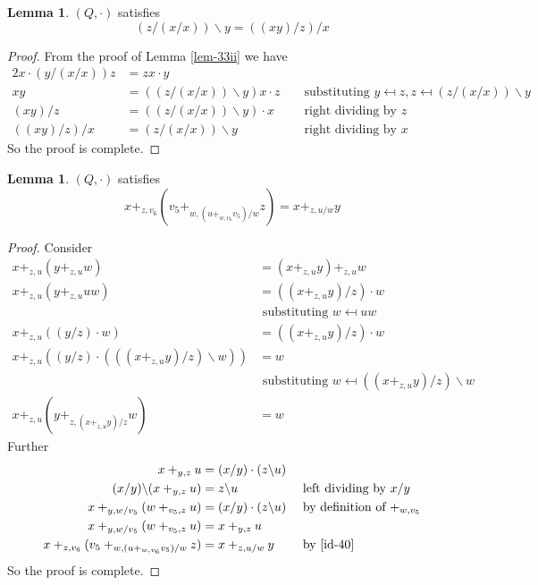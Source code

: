 \documentclass[12pt]{report}
\theoremstyle{definition}
\newtheorem{lem}[thm]{Lemma}
\newcommand{\ldv}{\backslash}       %
\newcommand{\rdv}{/}                %
\begin{document}
\begin{lem}\label{lem-38}
  $(Q,\cdot)$ satisfies
  \[(z\rdv(x\rdv x))\ldv y = ((xy)\rdv z)\rdv x\]
\end{lem}

\begin{proof}
  From the proof of Lemma \ref{lem-33ii} we have
  \begin{alignat*}{2}
    x\cdot (y\rdv(x\rdv x))z &= zx\cdot y &&\\
    xy &= ((z\rdv(x\rdv x))\ldv y)x \cdot z &&\text{ substituting
      $y\mapsfrom z, z\mapsfrom (z\rdv(x\rdv x))\ldv y$}\\
    (xy)\rdv z &= ((z\rdv(x\rdv x))\ldv y)\cdot x &&\text{ right dividing by $z$}\\
    ((xy)\rdv z)\rdv x &= (z\rdv(x\rdv x))\ldv y &&\text{ right dividing by $x$}
  \end{alignat*}
  So the proof is complete.
\end{proof}

\begin{lem}\label{lem-42}
  $(Q, \cdot)$ satisfies
  \[x +_{z, v_6} (v_5 +_{w, (u +_{w, v_6} v_5)\rdv w} z) = x +_{z, u\rdv w} y\] 
\end{lem}

\begin{proof}
  Consider
  \begin{align*}
    x +_{z, u} (y +_{z, u} w) &= (x +_{z, u} y) +_{z, u} w\\
    x +_{z, u} (y +_{z, u} uw) &= ((x +_{z, u} y)\rdv z)\cdot w\\
      &\text{ substituting $w\mapsfrom uw$}\\
    x +_{z, u} ((y\rdv z)\cdot w) &= ((x +_{z, u} y)\rdv z)\cdot w\\
    x +_{z, u} ((y\rdv z) \cdot (((x +_{z, u} y)\rdv z)\ldv w)) &= w\\
      &\text{ substituting $w\mapsfrom ((x +_{z, u} y)\rdv z)\ldv w$}\\
    x +_{z, u} (y +_{z, (x +_{z, u} y)\rdv z} w) &= w \label{id-40} \tag{I}
  \end{align*}
  Further
  \begin{alignat*}{2}
    x +_{y, z} u &= (x\rdv y)\cdot (z\ldv u) &&\\
    (x\rdv y)\ldv(x +_{y, z} u) &= z\ldv u &&\text{ left dividing by $x\rdv y$}\\
    x +_{y, w\rdv v_5} (w +_{v_5, z} u) &= (x\rdv y)\cdot (z\ldv u)
      &&\text{ by definition of $+_{w, v_5}$}\\
    x +_{y, w\rdv v_5} (w +_{v_5, z} u) &= x +_{y, z} u &&\\
    x +_{z, v_6} (v_5 +_{w, (u +_{w, v_6} v_5)\rdv w} z) &= x +_{z, u\rdv w} y
      &&\text{ by \ref{id-40}}
  \end{alignat*}
  So the proof is complete.
\end{proof}
\end{document}
